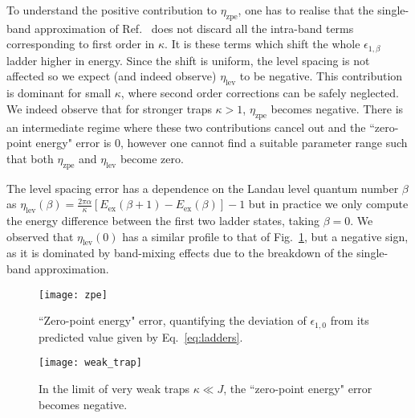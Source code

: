 \documentclass[twocolumn, 10pt, aps, superscriptaddress, floatfix, showpacs, pra, citeautoscript]{revtex4-1}
\newcommand{\co}[2]{#2}
\renewcommand{\paragraph}{\co}
\begin{document}
\paragraph{This contribution is due to intra-band terms.}
To understand the positive contribution to $\eta_{\text{zpe}}$, one
has to realise that the single-band approximation of
Ref.~ does not discard all the
intra-band terms corresponding to first order in $\kappa$. It is these
terms which shift the whole $\epsilon_{1,\beta}$ ladder higher in
energy. Since the shift is uniform, the level spacing is not affected
so we expect (and indeed observe) $\eta_{\text{lev}}$ to be
negative. This contribution is dominant for small $\kappa$, where
second order corrections can be safely neglected. We indeed observe
that for stronger traps $\kappa > 1$, $\eta_{\text{zpe}}$ becomes
negative. There is an intermediate regime where these two
contributions cancel out and the ``zero-point energy" error is 0,
however one cannot find a suitable parameter range such that both
$\eta_{\text{zpe}}$ and $\eta_{\text{lev}}$ become zero.


\paragraph{The level spacing error is dominated by band-mixing effects. }
The level spacing error has a dependence on the Landau level quantum
number $\beta$ as
$\eta_{\text{lev}}(\beta) = \frac{2\pi \alpha}{\kappa} [E_{\text{ex}}(\beta+1) -
E_{\text{ex}}(\beta)] -1$
but in practice we only compute the energy difference between the
first two ladder states, taking $\beta = 0$. We observed that
$\eta_{\text{lev}}(0)$ has a similar profile to that of
Fig.~\ref{fig:zpe}, but a negative sign, as it is dominated by
band-mixing effects due to the breakdown of the single-band
approximation.


\begin{figure}[htb]\centering
  \texttt{[image: zpe]}
  \caption{``Zero-point energy" error, quantifying the deviation of
    $\epsilon_{1,0}$ from its predicted value given by Eq.~\eqref{eq:ladders}.}
  \label{fig:zpe}
\end{figure}




\begin{figure}[htb]\centering
  \texttt{[image: weak\_trap]}
  \caption{In the limit of very weak traps $\kappa \ll J$, the
    ``zero-point energy" error becomes negative.}
  \label{fig:error_small_kappa}
\end{figure}
\end{document}
